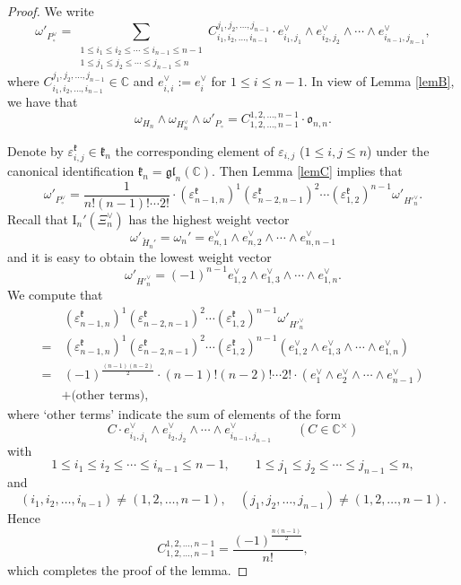 \documentclass[10pt,a4paper]{amsart}
\newcommand{\C}{\mathbb{C}}
\newcommand{\RI}{{\mathrm {I}}}
\begin{document}
	\begin{proof}
		We write
		\[
		\omega'_{P_{\circ}^{\vee}}=\sum_{\substack{
				1\leq i_1\leq i_2\leq \cdots\leq i_{n-1}\leq n-1\\
				1\leq j_1\leq j_2\leq\cdots\leq j_{n-1}\leq n
		}} C_{i_1,i_2,\dots,i_{n-1}}^{j_1,j_2,\dots,j_{n-1}}\cdot e^{\vee}_{i_1,j_1}\wedge e^{\vee}_{i_2,j_2}\wedge\cdots\wedge e^{\vee}_{i_{n-1},j_{n-1}},
		\]
		where $C_{i_1,i_2,\dots,i_{n-1}}^{j_1,j_2,\dots,j_{n-1}}\in\C$ and $e_{i,i}^{\vee}:=e_i^{\vee}$ for $1\leq i\leq n-1$. In view of Lemma \ref{lemB}, we have that
		\[
		\omega_{H_n}\wedge\omega_{H_n^{\vee}}\wedge\omega'_{P_{\circ}}=C_{1,2,\dots,n-1}^{1,2,\dots,n-1}\cdot\mathfrak{o}_{n,n}.
		\]
		
		Denote by $\varepsilon_{i,j}^{\mathfrak{k}}\in\mathfrak{k}_n$ the corresponding element of $\varepsilon_{i,j}$ ($1\leq i,j\leq n$) under the canonical identification $\mathfrak{k}_n=\mathfrak{gl}_n(\C)$. Then Lemma \ref{lemC} implies that
		\[
		\omega'_{P_{\circ}^{\vee}}=\frac{1}{n!(n-1)!\cdots 2!}\cdot(\varepsilon^{\mathfrak{k}}_{n-1,n})^1(\varepsilon^{\mathfrak{k}}_{n-2,n-1})^2\cdots(\varepsilon^{\mathfrak{k}}_{1,2})^{n-1}\omega'_{H'^{\vee}_n}.
		\]
		Recall that $\RI_n'(\Xi_n^{\vee})$ has the highest weight vector
		\[
		\omega'_{\check{H}_n'}=\omega_n'=e_{n,1}^{\vee}\wedge e_{n,2}^{\vee}\wedge\cdots\wedge e_{n,n-1}^{\vee}
		\]
		and it is easy to obtain the lowest weight vector
		\[
		\omega'_{H'^{\vee}_n}=(-1)^{n-1}e_{1,2}^{\vee}\wedge e_{1,3}^{\vee}\wedge\cdots\wedge e_{1,n}^{\vee}.
		\]
		We compute that
		\[
		\begin{aligned}
			&\,(\varepsilon^{\mathfrak{k}}_{n-1,n})^1(\varepsilon^{\mathfrak{k}}_{n-2,n-1})^2\cdots(\varepsilon^{\mathfrak{k}}_{1,2})^{n-1}\omega'_{H'^{\vee}_n}\\
			=&\,(\varepsilon^{\mathfrak{k}}_{n-1,n})^1(\varepsilon^{\mathfrak{k}}_{n-2,n-1})^2\cdots(\varepsilon^{\mathfrak{k}}_{1,2})^{n-1}\left(e_{1,2}^{\vee}\wedge e_{1,3}^{\vee}\wedge\cdots\wedge e_{1,n}^{\vee}\right)\\
			=&\,(-1)^{\frac{(n-1)(n-2)}{2}}\cdot(n-1)!(n-2)!\cdots2!\cdot\left(e_{1}^{\vee}\wedge e_{2}^{\vee}\wedge\cdots\wedge e_{n-1}^{\vee}\right)\\
			&+\text{(other terms)},
		\end{aligned}
		\]
		where `other terms' indicate the sum of elements of the form
		\[
		C\cdot e^{\vee}_{i_1,j_1}\wedge e^{\vee}_{i_2,j_2}\wedge\cdots\wedge e^{\vee}_{i_{n-1},j_{n-1}}\qquad (C\in\C^{\times})
		\]
		with
		\[
		1\leq i_1\leq i_2\leq \cdots\leq i_{n-1}\leq n-1,\qquad 1\leq j_1\leq j_2\leq\cdots\leq j_{n-1}\leq n,
		\]
		and
		\[
		\left(i_1,i_2,\dots,i_{n-1}\right)\neq\left(1,2,\dots,n-1\right),\quad\left(j_1,j_2,\dots,j_{n-1}\right)\neq\left(1,2,\dots,n-1\right).
		\]
		Hence
		\[
		C_{1,2,\dots,n-1}^{1,2,\dots,n-1}=\frac{(-1)^{\frac{n(n-1)}{2}}}{n!},
		\]
		which completes the proof of the lemma.
	\end{proof}
\end{document}

